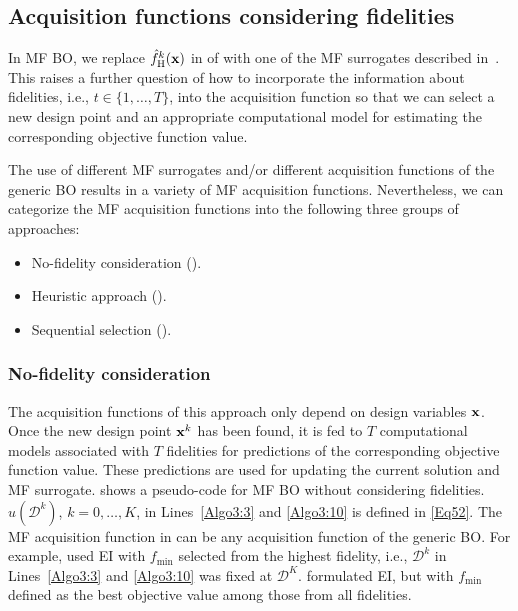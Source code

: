 \documentclass[iicol,sn-basic]{sn-jnl}%
\begin{document}
\subsection{Acquisition functions considering fidelities}\label{Sec52}

In MF BO, we replace $\hat{f}_\text{H}^k({\bf x})$ in  of  with one of the MF surrogates described in~.
This raises a further question of how to incorporate the information about fidelities, i.e., $t \in \{1,\dots,T\}$, into the acquisition function so that we can select a new design point and an appropriate computational model for estimating the corresponding objective function value. 
 
The use of different MF surrogates and/or different acquisition functions of the generic BO results in a variety of MF acquisition functions. Nevertheless, we can categorize the MF acquisition functions into the following three groups of approaches: 
\begin{itemize}
	\item No-fidelity consideration ().
	
	\item Heuristic approach ().
	
	\item Sequential selection ().
	 
\end{itemize}

\subsubsection{No-fidelity consideration}\label{Sec521}

The acquisition functions of this approach only depend on design variables $\bf x$.
Once the new design point ${\bf x}^k$ has been found, it is fed to $T$ computational models associated with $T$ fidelities for predictions of the corresponding objective function value.
These predictions are used for updating the current solution and MF surrogate.
 shows a pseudo-code for MF BO without considering fidelities.
$u(\mathcal{D}^k)$, $k=0,\dots,K$, in Lines~\ref{Algo3:3} and \ref{Algo3:10} is defined in \cref{Eq52}.
The MF acquisition function in  can be any acquisition function of the generic BO.
For example, \cite{Forrester2007} used EI with $f_{\min}$ selected from the highest fidelity, i.e., $\mathcal{D}^k$ in Lines~\ref{Algo3:3} and \ref{Algo3:10} was fixed at $\mathcal{D}^K$.
\cite{Perdikaris2016} formulated EI, but with $f_{\min}$ defined as the best objective value among those from all fidelities.
 
\end{document}
